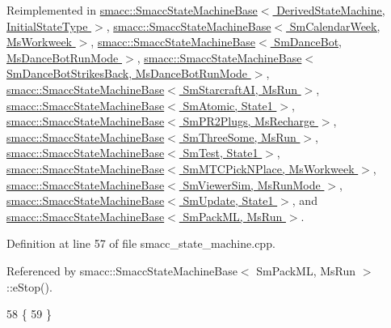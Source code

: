 Reimplemented in \hyperlink{structsmacc_1_1SmaccStateMachineBase_a3ba186af957cfe4ddbd7bdbe10630743}{smacc\+::\+Smacc\+State\+Machine\+Base$<$ Derived\+State\+Machine, Initial\+State\+Type $>$}, \hyperlink{structsmacc_1_1SmaccStateMachineBase_a3ba186af957cfe4ddbd7bdbe10630743}{smacc\+::\+Smacc\+State\+Machine\+Base$<$ Sm\+Calendar\+Week, Ms\+Workweek $>$}, \hyperlink{structsmacc_1_1SmaccStateMachineBase_a3ba186af957cfe4ddbd7bdbe10630743}{smacc\+::\+Smacc\+State\+Machine\+Base$<$ Sm\+Dance\+Bot, Ms\+Dance\+Bot\+Run\+Mode $>$}, \hyperlink{structsmacc_1_1SmaccStateMachineBase_a3ba186af957cfe4ddbd7bdbe10630743}{smacc\+::\+Smacc\+State\+Machine\+Base$<$ Sm\+Dance\+Bot\+Strikes\+Back, Ms\+Dance\+Bot\+Run\+Mode $>$}, \hyperlink{structsmacc_1_1SmaccStateMachineBase_a3ba186af957cfe4ddbd7bdbe10630743}{smacc\+::\+Smacc\+State\+Machine\+Base$<$ Sm\+Starcraft\+A\+I, Ms\+Run $>$}, \hyperlink{structsmacc_1_1SmaccStateMachineBase_a3ba186af957cfe4ddbd7bdbe10630743}{smacc\+::\+Smacc\+State\+Machine\+Base$<$ Sm\+Atomic, State1 $>$}, \hyperlink{structsmacc_1_1SmaccStateMachineBase_a3ba186af957cfe4ddbd7bdbe10630743}{smacc\+::\+Smacc\+State\+Machine\+Base$<$ Sm\+P\+R2\+Plugs, Ms\+Recharge $>$}, \hyperlink{structsmacc_1_1SmaccStateMachineBase_a3ba186af957cfe4ddbd7bdbe10630743}{smacc\+::\+Smacc\+State\+Machine\+Base$<$ Sm\+Three\+Some, Ms\+Run $>$}, \hyperlink{structsmacc_1_1SmaccStateMachineBase_a3ba186af957cfe4ddbd7bdbe10630743}{smacc\+::\+Smacc\+State\+Machine\+Base$<$ Sm\+Test, State1 $>$}, \hyperlink{structsmacc_1_1SmaccStateMachineBase_a3ba186af957cfe4ddbd7bdbe10630743}{smacc\+::\+Smacc\+State\+Machine\+Base$<$ Sm\+M\+T\+C\+Pick\+N\+Place, Ms\+Workweek $>$}, \hyperlink{structsmacc_1_1SmaccStateMachineBase_a3ba186af957cfe4ddbd7bdbe10630743}{smacc\+::\+Smacc\+State\+Machine\+Base$<$ Sm\+Viewer\+Sim, Ms\+Run\+Mode $>$}, \hyperlink{structsmacc_1_1SmaccStateMachineBase_a3ba186af957cfe4ddbd7bdbe10630743}{smacc\+::\+Smacc\+State\+Machine\+Base$<$ Sm\+Update, State1 $>$}, and \hyperlink{structsmacc_1_1SmaccStateMachineBase_a3ba186af957cfe4ddbd7bdbe10630743}{smacc\+::\+Smacc\+State\+Machine\+Base$<$ Sm\+Pack\+M\+L, Ms\+Run $>$}.



Definition at line 57 of file smacc\+\_\+state\+\_\+machine.\+cpp.



Referenced by smacc\+::\+Smacc\+State\+Machine\+Base$<$ Sm\+Pack\+M\+L, Ms\+Run $>$\+::e\+Stop().


\begin{DoxyCode}
58 \{
59 \}
\end{DoxyCode}



